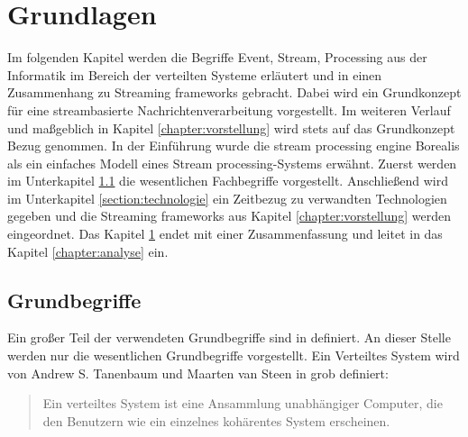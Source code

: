 \chapter{Grundlagen}
\label{chapter:grundlagen}

Im folgenden Kapitel werden die Begriffe Event, Stream, Processing aus der Informatik im Bereich der verteilten Systeme erläutert und in einen Zusammenhang zu Streaming frameworks gebracht. Dabei wird ein Grundkonzept für eine streambasierte Nachrichtenverarbeitung vorgestellt. Im weiteren Verlauf und maßgeblich in Kapitel \ref{chapter:vorstellung} wird stets auf das Grundkonzept Bezug genommen. In der Einführung wurde die stream processing engine Borealis  als ein einfaches Modell eines Stream processing-Systems erwähnt. Zuerst werden im Unterkapitel \ref{section:grundbegriffe} die wesentlichen Fachbegriffe vorgestellt. Anschließend wird im Unterkapitel \ref{section:technologie} ein Zeitbezug zu verwandten Technologien gegeben und die Streaming frameworks aus Kapitel \ref{chapter:vorstellung} werden eingeordnet. Das Kapitel \ref{chapter:grundlagen} endet mit einer Zusammenfassung und leitet in das Kapitel \ref{chapter:analyse} ein.

\section{Grundbegriffe}
\label{section:grundbegriffe}

Ein großer Teil der verwendeten Grundbegriffe sind in  definiert. An dieser Stelle werden nur die wesentlichen Grundbegriffe vorgestellt.
Ein Verteiltes System wird von Andrew S. Tanenbaum und Maarten van Steen in  grob definiert:

\begin{quote}
Ein verteiltes System ist eine Ansammlung unabhängiger Computer, die den Benutzern wie ein einzelnes kohärentes System erscheinen.
\end{quote}

